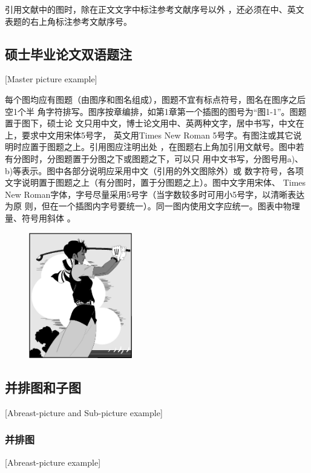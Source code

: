 引用文献中的图时，除在正文文字中标注参考文献序号以外
，还必须在中、英文表题的右上角标注参考文献序号。

\subsection{硕士毕业论文双语题注}[Master picture example]

每个图均应有图题（由图序和图名组成），图题不宜有标点符号，图名在图序之后空1个半
角字符排写。图序按章编排，如第1章第一个插图的图号为“图1-1”。图题置于图下，硕士论
文只用中文，博士论文用中、英两种文字，居中书写，中文在上，要求中文用宋体5号字，
英文用Times New Roman 5号字。有图注或其它说明时应置于图题之上。引用图应注明出处
，在图题右上角加引用文献号。图中若有分图时，分图题置于分图之下或图题之下，可以只
用中文书写，分图号用a)、b)等表示。图中各部分说明应采用中文（引用的外文图除外）或
数字符号，各项文字说明置于图题之上（有分图时，置于分图题之上）。图中文字用宋体、
Times New Roman字体，字号尽量采用5号字（当字数较多时可用小5号字，以清晰表达为原
则，但在一个插图内字号要统一）。同一图内使用文字应统一。图表中物理量、符号用斜体
。

\begin{figure}[htpb]
  \centering
  \includegraphics[width = 0.4\textwidth]{golfer}
\end{figure}

\subsection{并排图和子图}[Abreast-picture and Sub-picture example]
\subsubsection{并排图}[Abreast-picture example]

